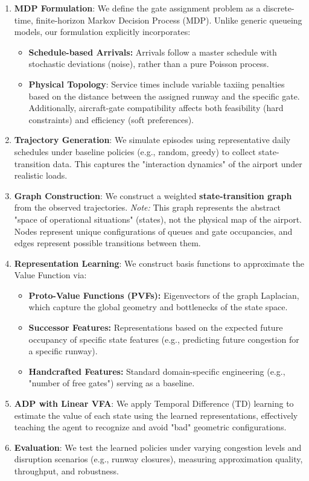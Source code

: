 \begin{enumerate}
	\item \textbf{MDP Formulation}: We define the gate assignment problem as a discrete-time, finite-horizon Markov Decision Process (MDP). Unlike generic queueing models, our formulation explicitly incorporates:
	\begin{itemize}
		\item \textbf{Schedule-based Arrivals:} Arrivals follow a master schedule with stochastic deviations (noise), rather than a pure Poisson process.
		\item \textbf{Physical Topology}: Service times include variable taxiing penalties 
		based on the distance between the assigned runway and the specific gate. 
		Additionally, aircraft-gate compatibility affects both feasibility (hard 
		constraints) and efficiency (soft preferences).
	\end{itemize}
	
	\item \textbf{Trajectory Generation}: We simulate episodes using representative daily schedules under baseline policies (e.g., random, greedy) to collect state-transition data. This captures the "interaction dynamics" of the airport under realistic loads.
	
	\item \textbf{Graph Construction}: We construct a weighted \textbf{state-transition graph} from the observed trajectories.
	\textit{Note:} This graph represents the abstract "space of operational situations" (states), not the physical map of the airport. Nodes represent unique configurations of queues and gate occupancies, and edges represent possible transitions between them.
	
	\item \textbf{Representation Learning}: We construct basis functions to approximate the Value Function via:
	\begin{itemize}
		\item \textbf{Proto-Value Functions (PVFs):} Eigenvectors of the graph Laplacian, which capture the global geometry and bottlenecks of the state space.
		\item \textbf{Successor Features:} Representations based on the expected future occupancy of specific state features (e.g., predicting future congestion for a specific runway).
		\item \textbf{Handcrafted Features:} Standard domain-specific engineering (e.g., "number of free gates") serving as a baseline.
	\end{itemize}
	
	\item \textbf{ADP with Linear VFA}: We apply Temporal Difference (TD) learning to estimate the value of each state using the learned representations, effectively teaching the agent to recognize and avoid "bad" geometric configurations.
	
	\item \textbf{Evaluation}: We test the learned policies under varying congestion levels and disruption scenarios (e.g., runway closures), measuring approximation quality, throughput, and robustness.
\end{enumerate}

